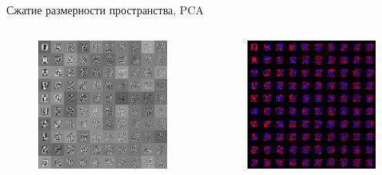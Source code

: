 \documentclass[10pt]{beamer}
\begin{document}
\begin{frame}{Сжатие размерности пространства, PCA}

\begin{columns}
	
	\begin{figure}[h!]
		\centering
  		\includegraphics[width=1\textwidth]{images/pca1.png}
	\end{figure} 
    
	
	\begin{figure}[h!]
		\centering
  		\includegraphics[width=1\textwidth]{images/pca2.png}
	\end{figure} 
	

\end{columns}
\end{frame}
\end{document}
